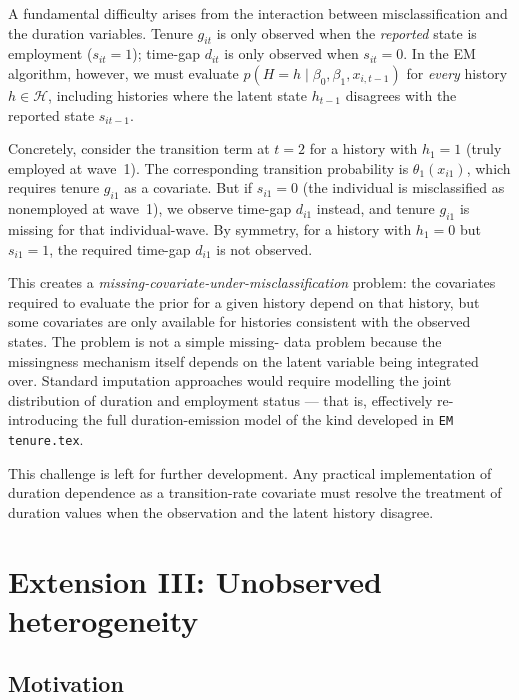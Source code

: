 \documentclass[12pt]{article}
\begin{document}
A fundamental difficulty arises from the interaction between
misclassification and the duration variables. Tenure \(g_{it}\) is
only observed when the \emph{reported} state is employment
(\(s_{it} = 1\)); time-gap \(d_{it}\) is only observed when
\(s_{it} = 0\). In the EM algorithm, however, we must evaluate
\(p(H = h \mid \beta_0, \beta_1, x_{i,t-1})\) for \emph{every} history
\(h \in \mathcal{H}\), including histories where the latent state
\(h_{t-1}\) disagrees with the reported state \(s_{it-1}\).

Concretely, consider the transition term at \(t=2\) for a history with
\(h_1 = 1\) (truly employed at wave~1). The corresponding transition
probability is \(\theta_1(x_{i1})\), which requires tenure \(g_{i1}\)
as a covariate. But if \(s_{i1} = 0\) (the individual is misclassified
as nonemployed at wave~1), we observe time-gap \(d_{i1}\) instead,
and tenure \(g_{i1}\) is missing for that individual-wave. By
symmetry, for a history with \(h_1 = 0\) but \(s_{i1} = 1\), the
required time-gap \(d_{i1}\) is not observed.

This creates a \emph{missing-covariate-under-misclassification} problem:
the covariates required to evaluate the prior for a given history depend
on that history, but some covariates are only available for histories
consistent with the observed states. The problem is not a simple missing-
data problem because the missingness mechanism itself depends on the
latent variable being integrated over. Standard imputation approaches
would require modelling the joint distribution of duration and employment
status — that is, effectively re-introducing the full duration-emission
model of the kind developed in \texttt{EM tenure.tex}.

This challenge is left for further development. Any practical
implementation of duration dependence as a transition-rate covariate must
resolve the treatment of duration values when the observation and the
latent history disagree.

\section{Extension III: Unobserved heterogeneity}
\label{sec:fmm}

\subsection{Motivation}
\end{document}
